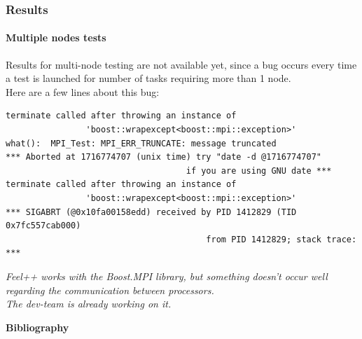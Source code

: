 \documentclass[10pt]{beamer}
\begin{document}
\begin{frame}[fragile]
    \frametitle{\textbf{Results}}
    \framesubtitle{\textbf{Multiple nodes tests}}
    Results for multi-node testing are not available yet, since a bug occurs every time a test is launched for number of tasks requiring more than 1 node. \\
    Here are a few lines about this bug: \\

\begin{scriptsize}
\begin{verbatim}
terminate called after throwing an instance of
                'boost::wrapexcept<boost::mpi::exception>'
what():  MPI_Test: MPI_ERR_TRUNCATE: message truncated
*** Aborted at 1716774707 (unix time) try "date -d @1716774707"
                                    if you are using GNU date ***
terminate called after throwing an instance of
                'boost::wrapexcept<boost::mpi::exception>'
*** SIGABRT (@0x10fa00158edd) received by PID 1412829 (TID 0x7fc557cab000)
                                        from PID 1412829; stack trace: ***
\end{verbatim}
\end{scriptsize}

    \textit{Feel++ works with the \textit{Boost.MPI} library, but something doesn't occur well regarding the communication between processors. \\
            The dev-team is already working on it.}
\end{frame}

\begin{frame}{\textbf{Bibliography}}
    \nocite{*}
    \printbibliography[heading=none]
\end{frame}
\end{document}
